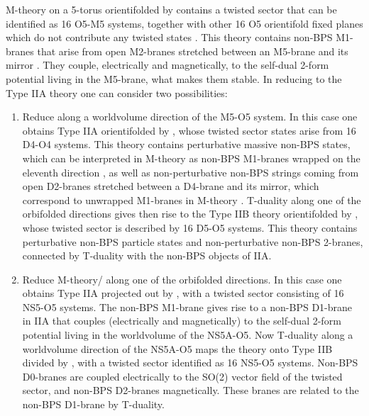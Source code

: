 \documentclass[12pt,a4paper]{article}
\begin{document}
M-theory on a 5-torus orientifolded by \coordHE{} contains 
a twisted sector that can be identified 
as 16 O5-M5 systems, together with other 16 O5 orientifold fixed planes
which do not contribute any twisted states \cite{W}.
This theory contains non-BPS M1-branes that arise from open
M2-branes stretched between an M5-brane and its mirror \cite{Sen*}. 
They couple,
electrically and magnetically, to the self-dual 2-form potential
living in the M5-brane, what makes them stable.
In reducing to the Type IIA theory one can consider two
possibilities: 

\begin{enumerate}

\item Reduce along a worldvolume direction of the M5-O5 system. 
In this case one obtains Type IIA 
orientifolded by \coordHE{}, whose twisted sector states arise from
16 D4-O4 systems. This theory contains perturbative massive non-BPS 
states, which can be interpreted in M-theory as non-BPS 
M1-branes wrapped on the eleventh direction \cite{Sen*}, 
as well as non-perturbative
non-BPS strings coming from open D2-branes stretched between a D4-brane
and its mirror, which correspond to unwrapped M1-branes in M-theory
\cite{Senrev}. T-duality along one of
the orbifolded directions gives then
rise to the Type IIB theory orientifolded by \coordHE{}, whose twisted
sector is described by 16 D5-O5 systems. This theory contains 
perturbative non-BPS particle states and non-perturbative non-BPS 2-branes, 
connected by T-duality with the non-BPS objects of IIA.


\item Reduce M-theory/\coordHE{} along
one of the orbifolded directions. In this case one obtains 
Type IIA projected out by \coordHE{}, with a twisted sector
consisting of 16 NS5-O5 systems.
The non-BPS M1-brane gives rise to a non-BPS D1-brane in IIA
that couples (electrically and magnetically) to the self-dual
2-form potential living in the worldvolume of the NS5A-O5. 
Now T-duality along a worldvolume direction of the NS5A-O5 maps
the theory onto Type IIB divided by \coordHE{}, with a twisted sector
identified as 16 NS5-O5 systems.  
Non-BPS D0-branes are coupled electrically to the SO(2) vector field of
the twisted sector, and non-BPS D2-branes
magnetically. These branes are related
to the non-BPS D1-brane by T-duality.

\end{enumerate}
\end{document}
